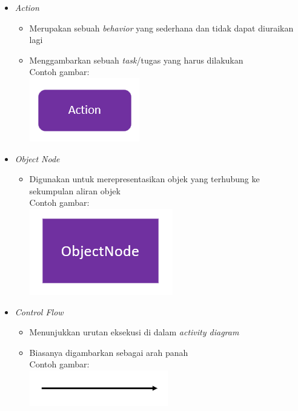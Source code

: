\documentclass[a4paper]{article}
\begin{document}
\begin{enumerate}
\begin{itemize}
\begin{itemize}
        \end{itemize}
        \newpage
        \item \textit{Action}
        \begin{itemize}
            \item Merupakan sebuah \textit{behavior} yang sederhana dan tidak dapat diuraikan lagi
            \item Menggambarkan sebuah \textit{task}/tugas yang harus dilakukan\autocite{systemanalysisdesign-activity-diagram}\\
                  Contoh gambar:\\
                  \includegraphics[scale=0.35]{Action_transparent.png}
        \end{itemize}
        \item \textit{Object Node}
        \begin{itemize}
            \item Digunakan untuk merepresentasikan objek yang terhubung ke sekumpulan aliran objek\autocite{systemanalysisdesign-activity-diagram}\\
                  Contoh gambar:\\
                  \includegraphics[scale=0.45]{ObjectNode_transparent.png}
        \end{itemize}
        \item \textit{Control Flow}
        \begin{itemize}
            \item Menunjukkan urutan eksekusi di dalam \textit{activity diagram}
            \item Biasanya digambarkan sebagai arah panah\autocite{systemanalysisdesign-activity-diagram}\\
                  Contoh gambar:\\
                  \includegraphics[scale=0.5]{Control Flow_transparent.png}

\end{itemize}
\end{itemize}
\end{enumerate}
\end{document}
